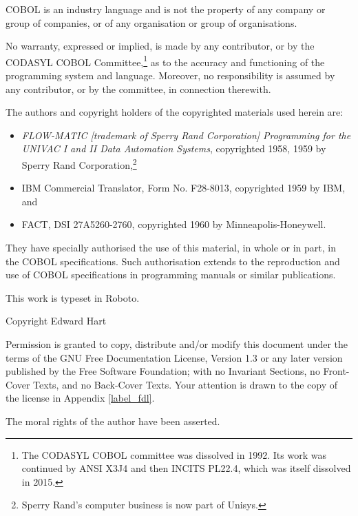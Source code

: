 \documentclass[a4paper,oneside,svgnames]{scrbook}
\begin{document}
\ifpdf
\nopagecolor
\else
\pagecolor{white}
\fi

\vspace*{\fill}

COBOL is an industry language and is not the property of any company or group of companies, or of any organisation or group of organisations.

No warranty, expressed or implied, is made by any contributor, or by the CODASYL COBOL Committee,\footnote{The CODASYL COBOL committee was dissolved in 1992. Its work was continued by ANSI X3J4 and then INCITS PL22.4, which was itself dissolved in 2015.} as to the accuracy and functioning of the programming system and language. Moreover, no responsibility is assumed by any contributor, or by the committee, in connection therewith.

The authors and copyright holders of the copyrighted materials used herein are:
\begin{itemize}
\item \textit{FLOW-MATIC \textup{[trademark of Sperry Rand Corporation]} Programming for the UNIVAC \textregistered{} I and II Data Automation Systems}, copyrighted 1958, 1959 by Sperry Rand Corporation,\footnote{Sperry Rand's computer business is now part of Unisys.}
\item IBM Commercial Translator, Form No. F28-8013, copyrighted 1959 by IBM, and
\item FACT, DSI 27A5260-2760, copyrighted 1960 by Minneapolis-Honeywell.
\end{itemize}

They have specially authorised the use of this material, in whole or in part, in the COBOL specifications. Such authorisation extends to the reproduction and use of COBOL specifications in programming manuals or similar publications.

\vfill

\begin{center}
  This work is typeset in Roboto.
\end{center}

\vfill

\begin{center}
  Copyright \textcopyright{} \the\year{} Edward Hart

  \vspace{5pt}

  Permission is granted to copy, distribute and\slash{}or modify this document under the terms of the GNU Free Documentation License, Version 1.3 or any later version published by the Free Software Foundation; with no Invariant Sections, no Front-Cover Texts, and no Back-Cover Texts. Your attention is drawn to the copy of the license in Appendix \ref{label_fdl}.
  \vspace{5pt}

  The moral rights of the author have been asserted.
\end{center}
\end{document}
